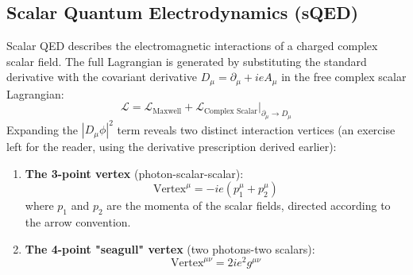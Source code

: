 \subsection{Scalar Quantum Electrodynamics (sQED)}

Scalar QED describes the electromagnetic interactions of a charged complex scalar field. The full Lagrangian is generated by substituting the standard derivative with the covariant derivative $D_\mu = \partial_\mu + ieA_\mu$ in the free complex scalar Lagrangian:
\[
    \mathcal{L} = \mathcal{L}_{\text{Maxwell}} + \mathcal{L}_{\text{Complex Scalar}} \Big|_{\partial_\mu \to D_\mu}
\]
Expanding the $|D_\mu \phi|^2$ term reveals two distinct interaction vertices (an exercise left for the reader, using the derivative prescription derived earlier):
\begin{enumerate}
    \item \textbf{The 3-point vertex} (photon-scalar-scalar):
          \[
              \text{Vertex}^\mu = -ie(p_1^\mu + p_2^\mu)
          \]
          where $p_1$ and $p_2$ are the momenta of the scalar fields, directed according to the arrow convention.

    \item \textbf{The 4-point "seagull" vertex} (two photons-two scalars):
          \[
              \text{Vertex}^{\mu\nu} = 2 i e^2 g^{\mu\nu}
          \]
\end{enumerate}


